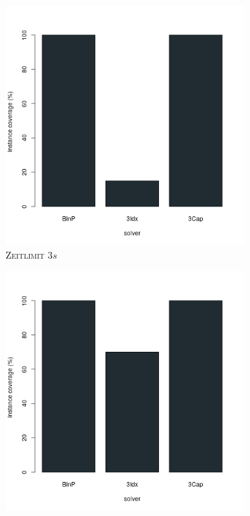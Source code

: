 \begin{figure}[H]
\centering

\begin{subfigure}[b]{0.3\textwidth}
\centering
\includegraphics[width=1.2\textwidth]{img/solver_instance_coverage_b=3_s_3s.png}
\caption{\textsc{Zeitlimit} $3s$}
\label{fig:instance_coverage_b=3_s_a}
\end{subfigure}
\hfill
\begin{subfigure}[b]{0.3\textwidth}
\centering
\includegraphics[width=1.2\textwidth]{img/solver_instance_coverage_b=3_s_5s.png}

\end{subfigure}
\end{figure}
